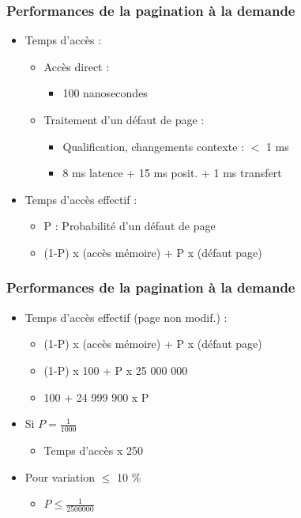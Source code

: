 \begin{frame}
\frametitle{Performances de la pagination à la demande}
\begin{itemize}
\item Temps d'accès :
\begin{itemize}
\item Accès direct :
\begin{itemize}
\item 100 nanosecondes
\end{itemize}
\item Traitement d'un défaut de page : 
\begin{itemize}
\item Qualification, changements contexte : $<$ 1 ms
\item 8 ms latence + 15 ms posit. + 1 ms transfert
\end{itemize}
\end{itemize}
\item Temps d'accès effectif :
\begin{itemize}
\item P : Probabilité d'un défaut de page
\item (1-P) x (accès mémoire) + P x (défaut page)
\end{itemize}
\end{itemize}
\end{frame}


\begin{frame}
\frametitle{Performances de la pagination à la demande}
\begin{itemize}
\item Temps d’accès effectif (page non modif.) :
\begin{itemize}
\item (1-P) x (accès mémoire) + P x (défaut page)
\item (1-P) x 100 + P x 25 000 000
\item 100 + 24 999 900 x P
\end{itemize}
\item Si $P = \frac{1}{1000}$
\begin{itemize}
\item Temps d'accès x 250
\end{itemize}
\item Pour variation $\le$ 10 \%
\begin{itemize}
\item $P \le \frac{1}{2500000}$
\end{itemize}
\end{itemize}
\end{frame}


